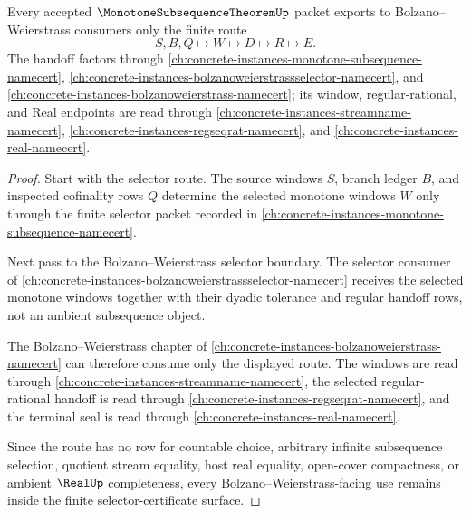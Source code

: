 \begin{theorem}
\label{thm:monotone-subsequence-theorem-bolzano-weierstrass-handoff}
Every accepted $\MonotoneSubsequenceTheoremUp$ packet exports to Bolzano--Weierstrass consumers only the finite route
$$
S,B,Q\longmapsto W\longmapsto D\longmapsto R\longmapsto E.
$$
The handoff factors through \autoref{ch:concrete-instances-monotone-subsequence-namecert}, \autoref{ch:concrete-instances-bolzanoweierstrassselector-namecert}, and \autoref{ch:concrete-instances-bolzanoweierstrass-namecert}; its window, regular-rational, and Real endpoints are read through \autoref{ch:concrete-instances-streamname-namecert}, \autoref{ch:concrete-instances-regseqrat-namecert}, and \autoref{ch:concrete-instances-real-namecert}.
\end{theorem}
\begin{proof}
Start with the selector route. The source windows $S$, branch ledger $B$, and inspected cofinality rows $Q$ determine the selected monotone windows $W$ only through the finite selector packet recorded in \autoref{ch:concrete-instances-monotone-subsequence-namecert}.

Next pass to the Bolzano--Weierstrass selector boundary. The selector consumer of \autoref{ch:concrete-instances-bolzanoweierstrassselector-namecert} receives the selected monotone windows together with their dyadic tolerance and regular handoff rows, not an ambient subsequence object.

The Bolzano--Weierstrass chapter of \autoref{ch:concrete-instances-bolzanoweierstrass-namecert} can therefore consume only the displayed route. The windows are read through \autoref{ch:concrete-instances-streamname-namecert}, the selected regular-rational handoff is read through \autoref{ch:concrete-instances-regseqrat-namecert}, and the terminal seal is read through \autoref{ch:concrete-instances-real-namecert}.

Since the route has no row for countable choice, arbitrary infinite subsequence selection, quotient stream equality, host real equality, open-cover compactness, or ambient $\RealUp$ completeness, every Bolzano--Weierstrass-facing use remains inside the finite selector-certificate surface.
\end{proof}


